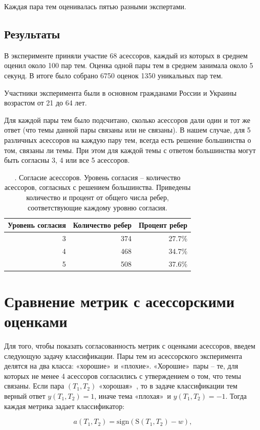 Каждая пара тем оценивалась пятью разными экспертами.

\subsection{Результаты}
В эксперименте приняли участие 68 асессоров, каждый из которых в среднем оценил около 100 пар тем. Оценка одной пары тем в среднем занимала около 5 секунд.
  В итоге было собрано 6750 оценок 1350 уникальных пар тем.
  
Участники эксперимента были в основном гражданами России и Украины возрастом от 21 до 64 лет.


Для каждой пары тем было подсчитано, сколько асессоров дали один и тот же ответ (что темы данной пары связаны или не связаны). В нашем случае, для 5 различных асессоров на каждую пару тем, всегда есть решение большинства о том, связаны ли темы. При этом для каждой темы с ответом большинства могут быть согласны 3, 4 или все 5 асессоров. 

\begin{table}[h!]
\centering
\begin{tabular}{r|r|r}
 Уровень согласия & Количество ребер & Процент ребер \\
\hline
3 & 374 & 27.7\% \\
\hline
4 & 468 & 34.7\% \\
\hline
5 & 508 & 37.6\% 
\end{tabular}
\caption{\label{table:agreement}. Согласие асессоров. Уровень согласия -- количество асессоров, согласных с решением большинства. Приведены количество и процент от общего числа ребер, соответствующие каждому уровню согласия.}
\end{table}


\section{Сравнение метрик с асессорскими оценками}

Для того, чтобы показать согласованность метрик с оценками асессоров, введем следующую задачу классификации. Пары тем из асессорского эксперимента делятся на два класса: «хорошие»\ и «плохие». «Хорошие»\ пары -- те, для которых не менее 4 асессоров согласились с утверждением о том, что темы связаны. Если пара  $(T_1, T_2)$ «хорошая»\ , то в задаче классификации тем верный ответ $y(T_1, T_2) = 1$, иначе тема «плохая»\ и $y(T_1, T_2)= -1$. Тогда каждая метрика задает классификатор:

$$a(T_1, T_2) = \text{sign}(\mathrm{S}(T_1, T_2) - w),$$

